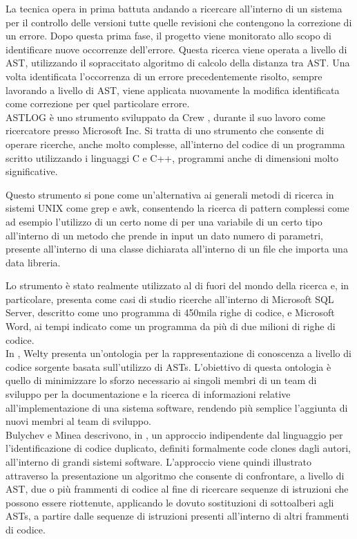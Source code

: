 La tecnica opera in prima battuta andando a ricercare all’interno di un sistema
per il controllo delle versioni tutte quelle revisioni che contengono la
correzione di un errore. Dopo questa prima fase, il progetto viene monitorato
allo scopo di identificare nuove occorrenze dell’errore. Questa ricerca viene
operata a livello di AST, utilizzando il sopraccitato algoritmo di calcolo
della distanza tra AST. Una volta identificata l’occorrenza di un errore
precedentemente risolto, sempre lavorando a livello di AST, viene applicata
nuovamente la modifica identificata come correzione per quel particolare
errore.\\

ASTLOG è uno strumento sviluppato da Crew \cite{DBLP:conf/dsl/Crew97}, durante
il suo lavoro come ricercatore presso Microsoft Inc. Si tratta di uno strumento
che consente di operare ricerche, anche molto complesse, all’interno del codice
di un programma scritto utilizzando i linguaggi C e C++, programmi anche di
dimensioni molto significative.

Questo strumento si pone come un’alternativa ai generali metodi di ricerca in
sistemi UNIX come grep e awk, consentendo la ricerca di pattern complessi come
ad esempio l’utilizzo di un certo nome di per una variabile di un certo tipo
all’interno di un metodo che prende in input un dato numero di parametri,
presente all’interno di una classe dichiarata all’interno di un file che
importa una data libreria.

Lo strumento è stato realmente utilizzato al di fuori del mondo della ricerca
e, in particolare, \cite{DBLP:conf/dsl/Crew97} presenta come casi di studio
ricerche all’interno di Microsoft SQL Server, descritto come uno programma di
450mila righe di codice, e Microsoft Word, ai tempi indicato come un programma
da più di due milioni di righe di codice.\\

In \cite{DBLP:conf/kbse/Welty97}, Welty presenta un’ontologia per la
rappresentazione di conoscenza a livello di codice sorgente basata
sull’utilizzo di ASTs. L’obiettivo di questa ontologia è quello di minimizzare
lo sforzo necessario ai singoli membri di un team di sviluppo per la
documentazione e la ricerca di informazioni relative all’implementazione di una
sistema software, rendendo più semplice l’aggiunta di nuovi membri al team di
sviluppo.\\

Bulychev e Minea descrivono, in \cite{peter2008duplicate}, un approccio
indipendente dal linguaggio per l’identificazione di codice duplicato, definiti
formalmente code clones dagli autori, all’interno di grandi sistemi software.
L’approccio viene quindi illustrato attraverso la presentazione un algoritmo
che consente di confrontare, a livello di AST, due o più frammenti di codice al
fine di ricercare sequenze di istruzioni che possono essere riottenute,
applicando le dovuto sostituzioni di sottoalberi agli ASTs, a partire dalle
sequenze di istruzioni presenti all’interno di altri frammenti di codice.\\

